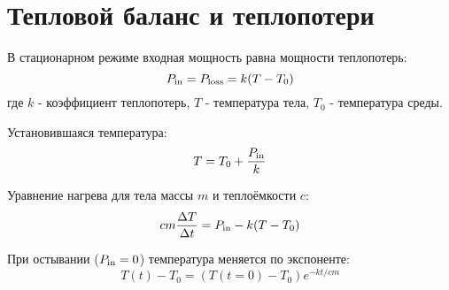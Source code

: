 \documentclass{article}
\begin{document}
\section*{Тепловой баланс и теплопотери}

В стационарном режиме входная мощность равна мощности теплопотерь:
\[
P_{\rm in}=P_{\rm loss}=k(T-T_0)
\]
где $k$ - коэффициент теплопотерь, $T$ - температура тела, $T_0$ - температура среды.

Установившаяся температура:
\[
T=T_0+\frac{P_{\rm in}}{k}
\]

Уравнение нагрева для тела массы $m$ и теплоёмкости $c$:
\[
cm\frac{\Delta T}{\Delta t}=P_{\rm in}-k(T-T_0)
\]

При остывании ($P_{\rm in}=0$) температура меняется по экспоненте:
\[
T(t)-T_0 = (T(t=0)-T_0)e^{-kt/cm}
\]
\end{document}
